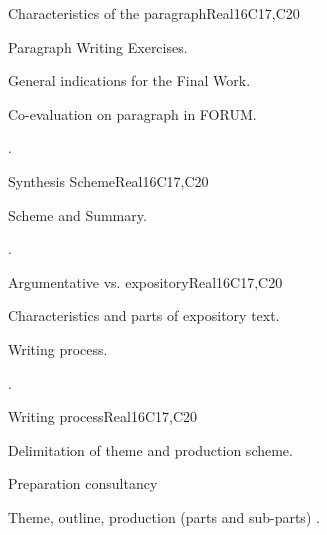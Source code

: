 \begin{syllabus}
\begin{unit}{Characteristics of the paragraph}{}{Real}{16}{C17,C20}
  \begin{topics}
      \item Paragraph Writing Exercises.
      \item General indications for the Final Work.
      \item Co-evaluation on paragraph in FORUM.
  \end{topics}

  \begin{learningoutcomes}
   \item .%
  \end{learningoutcomes}
\end{unit}

\begin{unit}{Synthesis Scheme}{}{Real}{16}{C17,C20}
  \begin{topics}
      \item Scheme and Summary.
  \end{topics}

  \begin{learningoutcomes}
   \item .%
  \end{learningoutcomes}
\end{unit}

\begin{unit}{Argumentative vs. expository}{}{Real}{16}{C17,C20}
  \begin{topics}
      \item Characteristics and parts of expository text.
      \item Writing process.
  \end{topics}

  \begin{learningoutcomes}
   \item .%
  \end{learningoutcomes}
\end{unit}


\begin{unit}{Writing process}{}{Real}{16}{C17,C20}
  \begin{topics}
      \item Delimitation of theme and production scheme.
      \item Preparation consultancy
      \item Theme, outline, production (parts and sub-parts) .
  \end{topics}


\end{unit}
\end{syllabus}
